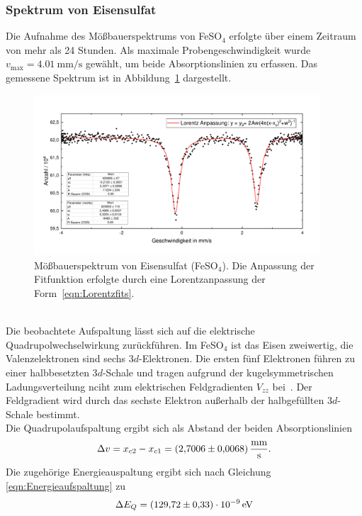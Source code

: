 \documentclass[a4paper,twoside,final]{article}
\begin{document}
\subsubsection{Spektrum von Eisensulfat}
Die Aufnahme des Mößbauerspektrums von FeSO$_4$ erfolgte über einem Zeitraum von mehr als 24 Stunden. Als maximale Probengeschwindigkeit wurde $v_\text{max} = \SI{4,01}{\milli\metre\per\second}$ gewählt, um beide Absorptionslinien zu erfassen. Das gemessene Spektrum ist in Abbildung~\ref{fig:Moessbauer_FeSO4_Lorentz.pdf} dargestellt.
\begin{figure}[htp]
    \centering
    \includegraphics[width=0.95\textwidth]{Bilder/Moessbauer_FeSO4_Lorentz.pdf}
    \caption{Mößbauerspektrum von Eisensulfat (FeSO$_4$). Die Anpassung der Fitfunktion erfolgte durch eine Lorentzanpassung der Form~\eqref{eqn:Lorentzfits}.}
    \label{fig:Moessbauer_FeSO4_Lorentz.pdf}
\end{figure}\\
Die beobachtete Aufspaltung lässt sich auf die elektrische Quadrupolwechselwirkung zurückführen. Im FeSO$_4$ ist das Eisen zweiwertig, die Valenzelektronen sind sechs 3$d$-Elektronen. Die ersten fünf Elektronen führen zu einer halbbesetzten 3$d$-Schale und tragen aufgrund der kugelsymmetrischen Ladungsverteilung nciht zum elektrischen Feldgradienten $V_{zz}$ bei~\cite{Schatz}. Der Feldgradient wird durch das sechste Elektron außerhalb der halbgefüllten 3$d$-Schale bestimmt.\\
Die Quadrupolaufspaltung ergibt sich als Abstand der beiden Absorptionslinien
\begin{align}
  \Delta v = x_{c2} - x_{c1} = \SI[per-mode=fraction, separate-uncertainty]{2,7006 \pm 0,0068}{\milli\metre\per\second}.
\end{align}
Die zugehörige Energieauspaltung ergibt sich nach Gleichung \eqref{eqn:Energieaufspaltung} zu
\begin{align}
  \Delta E_Q = \SI[per-mode=fraction, separate-uncertainty]{129,72
\pm 0,33e-9}{\electronvolt}
\end{align}
\end{document}
